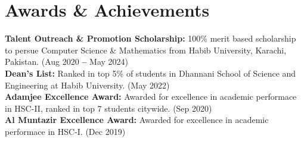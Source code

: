 \section{Awards \& Achievements}
\vspace{2pt}
\resumeSubHeadingListStart
{\item{
                  \textbf{Talent Outreach \& Promotion Scholarship:}{ 100\% merit based scholarship to persue Computer Science \& Mathematics from Habib University, Karachi, Pakistan. (Aug 2020 \textbf{--} May 2024)} \\
                  \textbf{Dean's List:}{ Ranked in top 5\% of students in Dhannani School of Science and Engineering at Habib University. (May 2022)}\\
                  \textbf{Adamjee Excellence Award:}{ Awarded for excellence in academic performace in HSC-II, ranked in top 7 students citywide. (Sep 2020)}\\
                  \textbf{Al Muntazir Excellence Award:}{ Awarded for excellence in academic performace in HSC-I. (Dec 2019)}
            }}
\resumeSubHeadingListEnd
